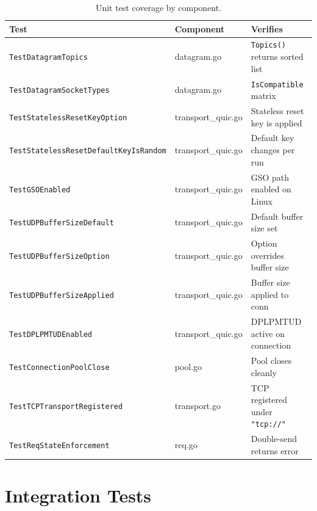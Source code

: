 \documentclass[12pt, a4paper, oneside]{report}
\begin{document}
\begin{table}[H]
  \centering
  \caption{Unit test coverage by component.}
  \label{tab:unit-tests}
  \begin{tabular}{lll}
    \toprule
    \textbf{Test} & \textbf{Component} & \textbf{Verifies} \\
    \midrule
    \texttt{TestDatagramTopics}       & datagram.go         & \texttt{Topics()} returns sorted list \\
    \texttt{TestDatagramSocketTypes}  & datagram.go         & \texttt{IsCompatible} matrix \\
    \texttt{TestStatelessResetKeyOption} & transport\_quic.go & Stateless reset key is applied \\
    \texttt{TestStatelessResetDefaultKeyIsRandom} & transport\_quic.go & Default key changes per run \\
    \texttt{TestGSOEnabled}           & transport\_quic.go  & GSO path enabled on Linux \\
    \texttt{TestUDPBufferSizeDefault} & transport\_quic.go  & Default buffer size set \\
    \texttt{TestUDPBufferSizeOption}  & transport\_quic.go  & Option overrides buffer size \\
    \texttt{TestUDPBufferSizeApplied} & transport\_quic.go  & Buffer size applied to conn \\
    \texttt{TestDPLPMTUDEnabled}      & transport\_quic.go  & DPLPMTUD active on connection \\
    \texttt{TestConnectionPoolClose}  & pool.go             & Pool closes cleanly \\
    \texttt{TestTCPTransportRegistered} & transport.go      & TCP registered under \texttt{"tcp://"} \\
    \texttt{TestReqStateEnforcement}  & req.go              & Double-send returns error \\
    \bottomrule
  \end{tabular}
\end{table}

\section{Integration Tests}
\label{sec:integration-tests}
\end{document}
